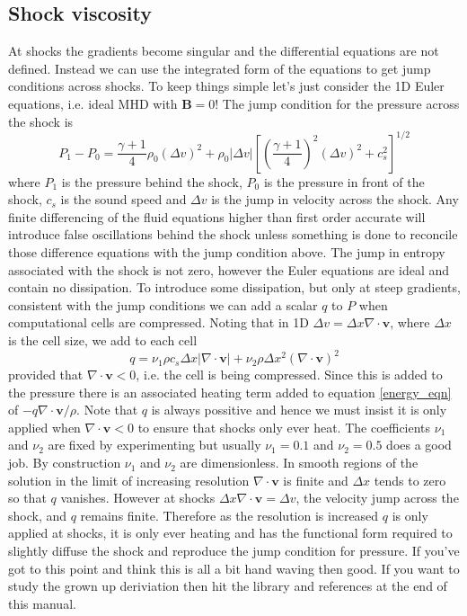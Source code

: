 \documentclass[11pt]{article}
\begin{document}
\subsection{Shock viscosity}
At shocks the gradients become singular and the differential equations are not defined. Instead we can use the integrated form of the equations to get jump conditions across shocks. To keep things simple let's just consider the 1D Euler equations, i.e. ideal MHD with $\mathbf{B}=0$! The jump condition for the pressure across the shock is 
\begin{equation}
P_1-P_0=\frac{\gamma+1}{4}\rho_0(\Delta v)^2 + \rho_0 |\Delta v|\left[\left(\frac{\gamma+1}{4}\right)^2(\Delta v)^2 + c_s^2\right]^{1/2}\label{jump}
\end{equation}
where $P_1$ is the pressure behind the shock, $P_0$ is the pressure in front of the shock, $c_s$ is the sound speed and $\Delta v$ is the jump in velocity across the shock. Any finite differencing of the fluid equations higher than first order accurate will introduce false oscillations behind the shock unless something is done to reconcile those difference equations with the jump condition above. The jump in entropy associated with the shock is not zero, however the Euler equations are ideal and contain no dissipation. To introduce some dissipation, but only at steep gradients, consistent with the jump conditions we can add a scalar $q$ to $P$ when computational cells are compressed. Noting that in 1D $\Delta v=\Delta x \nabla\cdot\mathbf{v}$, where $\Delta x$ is the cell size, we add to each cell
\begin{displaymath}
q = \nu_1 \rho c_s \Delta x |\nabla\cdot\mathbf{v}| + \nu_2 \rho \Delta x^2 (\nabla\cdot\mathbf{v})^2
\end{displaymath}
provided that $\nabla\cdot\mathbf{v}<0$, i.e. the cell is being compressed. Since this is added to the pressure there is an associated heating term added to equation \ref{energy_eqn} of $-q \nabla\cdot\mathbf{v}/\rho$. Note that $q$ is always possitive and hence we must insist it is only applied when $\nabla\cdot\mathbf{v}<0$ to ensure that shocks only ever heat. The coefficients $\nu_1$ and $\nu_2$ are fixed by experimenting but usually $\nu_1=0.1$ and $\nu_2=0.5$ does a good job. By construction $\nu_1$ and $\nu_2$ are dimensionless. In smooth regions of the solution in the limit of increasing resolution $\nabla\cdot\mathbf{v}$ is finite and $\Delta x$ tends to zero so that $q$ vanishes. However at shocks $\Delta x \nabla\cdot\mathbf{v}=\Delta v$, the velocity jump across the shock, and $q$ remains finite. Therefore as the resolution is increased $q$ is only applied at shocks, it is only ever heating and has the functional form required to slightly diffuse the shock and reproduce the jump condition for pressure. If you've got to this point and think this is all a bit hand waving then good. If you want to study the grown up deriviation then hit the library and references at the end of this manual. 
\end{document}
